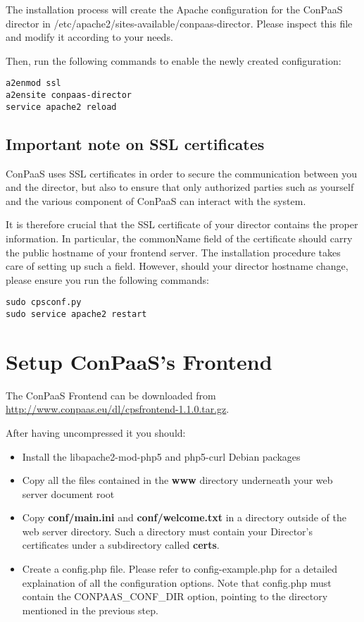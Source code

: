 \documentclass[10pt]{article}
\begin{document}
The installation process will create the Apache configuration for the ConPaaS
director in /etc/apache2/sites-available/conpaas-director. Please inspect this
file and modify it according to your needs.

Then, run the following commands to enable the newly created configuration:

\begin{verbatim}
a2enmod ssl
a2ensite conpaas-director
service apache2 reload
\end{verbatim}

\subsection{Important note on SSL certificates}
ConPaaS uses SSL certificates in order to secure the communication between you
and the director, but also to ensure that only authorized parties such as
yourself and the various component of ConPaaS can interact with the system.

It is therefore crucial that the SSL certificate of your director contains the
proper information. In particular, the commonName field of the certificate
should carry the public hostname of your frontend server. The installation
procedure takes care of setting up such a field. However, should your director
hostname change, please ensure you run the following commands:

\begin{verbatim}
sudo cpsconf.py
sudo service apache2 restart
\end{verbatim}

\section{Setup ConPaaS's Frontend}
\label{sec:frontend}

The ConPaaS Frontend can be downloaded from
\url{http://www.conpaas.eu/dl/cpsfrontend-1.1.0.tar.gz}.

After having uncompressed it you should:

\begin{itemize}
\item Install the libapache2-mod-php5 and php5-curl Debian packages
\item Copy all the files contained in the \textbf{www} directory underneath your web server document root
\item Copy \textbf{conf/main.ini} and \textbf{conf/welcome.txt} in a directory
  outside of the web server directory. Such a directory must contain your
  Director's certificates under a subdirectory called \textbf{certs}.
\item Create a config.php file. Please refer to
  config-example.php for a detailed explaination of all the configuration
  options. Note that config.php must contain the CONPAAS\_CONF\_DIR option,
  pointing to the directory mentioned in the previous step.
\end{itemize}
\end{document}
